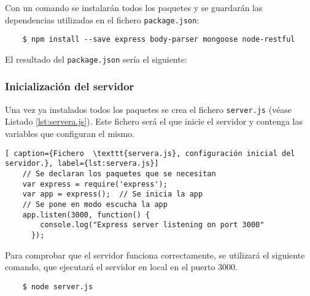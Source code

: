 Con un comando se instalarán todos los paquetes y se guardarán las dependencias utilizadas en el fichero \texttt{package.json}:

\begin{lstlisting}
    $ npm install --save express body-parser mongoose node-restful
\end{lstlisting}

El resultado del \texttt{package.json} sería el siguiente:


\subsubsection{Inicialización del servidor}

Una vez ya instalados todos los paquetes se crea el fichero \texttt{server.js} (véase Listado \ref{lst:servera.js}). Este fichero será el que inicie el servidor y contenga las variables que configuran el mismo. 


\begin{lstlisting}[ caption={Fichero  \texttt{servera.js}, configuración inicial del servidor.}, label={lst:servera.js}]
    // Se declaran los paquetes que se necesitan
    var express = require('express');  
    var app = express();  // Se inicia la app
    // Se pone en modo escucha la app
    app.listen(3000, function() {
        console.log("Express server listening on port 3000"
      });

\end{lstlisting}

Para comprobar que el servidor funciona correctamente, se utilizará el siguiente comando, que ejecutará el servidor en local en el puerto 3000.
\begin{lstlisting}
    $ node server.js
\end{lstlisting}

